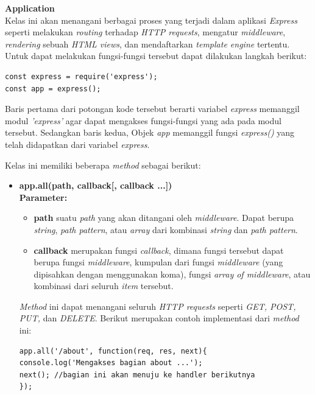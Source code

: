 \documentclass[a4paper,twoside]{article}
\begin{document}
\begin{enumerate}
\begin{enumerate}
\begin{itemize}
			\end{itemize}
			
			
			\textbf{Application} \\
			Kelas ini akan menangani berbagai proses yang terjadi dalam aplikasi \textit{Express} seperti melakukan \textit{routing} terhadap \textit{HTTP requests}, mengatur \textit{middleware}, \textit{rendering} sebuah \textit{HTML views}, dan mendaftarkan \textit{template engine} tertentu. Untuk dapat melakukan fungsi-fungsi tersebut dapat dilakukan langkah berikut:
			
\begin{lstlisting}
const express = require('express');
const app = express();
\end{lstlisting}
			
			Baris pertama dari potongan kode tersebut berarti variabel \textit{express} memanggil modul \textit{'express'} agar dapat mengakses fungsi-fungsi yang ada pada modul tersebut. Sedangkan baris kedua, Objek \textit{app} memanggil fungsi \textit{express()} yang telah didapatkan dari variabel \textit{express}.
			
			Kelas ini memiliki beberapa \textit{method} sebagai berikut:
			
			\begin{itemize}
				\item \textbf{app.all(path, callback[, callback ...])} \\ \textbf{Parameter:} 
				\begin{itemize}
					\item \textbf{path} suatu \textit{path} yang akan ditangani oleh \textit{middleware}. Dapat berupa \textit{string}, \textit{path pattern}, atau \textit{array} dari kombinasi \textit{string} dan \textit{path pattern}.
					
					\item \textbf{callback} merupakan fungsi \textit{callback}, dimana fungsi tersebut dapat berupa fungsi \textit{middleware}, kumpulan dari fungsi \textit{middleware} (yang dipisahkan dengan menggunakan koma), fungsi \textit{array of middleware}, atau kombinasi dari seluruh \textit{item} tersebut.
				\end{itemize}
				
				\textit{Method} ini dapat menangani seluruh \textit{HTTP requests} seperti \textit{GET, POST, PUT,} dan \textit{DELETE}. Berikut merupakan contoh implementasi dari \textit{method} ini:
\begin{lstlisting}
app.all('/about', function(req, res, next){
console.log('Mengakses bagian about ...');
next(); //bagian ini akan menuju ke handler berikutnya
});
\end{lstlisting}
				

\end{itemize}
\end{enumerate}
\end{enumerate}
\end{document}
